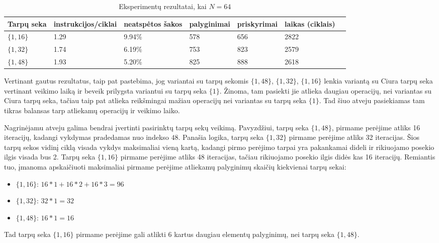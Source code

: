 \documentclass{VUMIFInfBakalaurinis}
\begin{document}
\begin{table}[H]
  \caption{Eksperimentų rezultatai, kai $N = 64$}
  \label{perf_results2_64}
  \centering
  \begin{tabular}{@{}lllllll@{}}
  Tarpų seka             & instrukcijos/ciklai     & neatspėtos šakos  & palyginimai       & priskyrimai      & laikas (ciklais) \\ \midrule
  $\{1, 16 \}$            & 1.29                    & 9.94\%            & 578               & 656              & 2822                  \\
  $\{1, 32 \}$            & 1.74                    & 6.19\%            & 753               & 823              & 2579                  \\
  $\{1, 48 \}$            & 1.93                    & 5.20\%            & 825               & 888              & 2618                  \\ \bottomrule
  \end{tabular}
\end{table}

Vertinant gautus rezultatus, taip pat pastebima, jog variantai su tarpų sekomis $\{1, 48 \}$, $\{1, 32 \}$, $\{1, 16 \}$ lenkia variantą
su Ciura tarpų seka vertinant veikimo laiką ir beveik prilygsta variantui su tarpų seka $\{1\}$.
Žinoma, tam pasiekti jie atlieka daugiau operacijų, nei variantas su Ciura tarpų seka, tačiau taip pat atlieka reikšmingai mažiau operacijų nei variantas su tarpų seka $\{1\}$.
Tad šiuo atveju pasiekiamas tam tikras balansas tarp atliekamų operacijų ir veikimo laiko.

Nagrinėjamu atveju galima bendrai įvertinti pasirinktų tarpų sekų veikimą.
Pavyzdžiui, tarpų seka $\{ 1, 48 \}$, pirmame perėjime atliks 16 iteracijų, kadangi vykdymas pradedamas nuo indekso $48$.
Panašia logika, tarpų seka $\{1, 32 \}$ pirmame perėjime atliks 32 iteracijas.
Šios tarpų sekos vidinį ciklą visada vykdys maksimaliai vieną kartą, kadangi pirmo perėjimo tarpai yra pakankamai dideli ir rikiuojamo posekio ilgis visada bus 2.
Tarpų seka $\{1, 16 \}$ pirmame perėjime atliks 48 iteracijas, tačiau rikiuojamo posekio ilgis didės kas 16 iteracijų.
Remiantis tuo, įmanoma apskaičiuoti maksimaliai pirmame perėjime atliekamų palyginimų skaičių kiekvienai tarpų sekai:
\begin{itemize}
  \item $\{1, 16 \}$: $16 * 1 + 16 * 2 + 16 * 3 = 96$
  \item $\{1, 32 \}$: $32 * 1 = 32$
  \item $\{1, 48 \}$: $16 * 1 = 16$
\end{itemize}
Tad tarpų seka $\{1, 16 \}$ pirmame perėjime gali atlikti 6 kartus daugiau elementų palyginimų, nei tarpų seka $\{1, 48 \}$.
\end{document}
